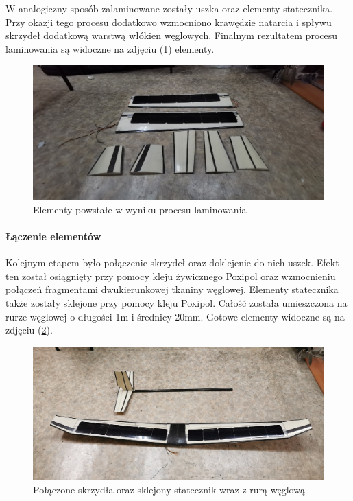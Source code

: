 \documentclass[12pt, a4paper]{article}
\let\oldref\ref
\renewcommand{\ref}[1]{(\oldref{#1})}
\begin{document}
W analogiczny sposób zalaminowane zostały uszka oraz elementy statecznika. Przy okazji tego procesu dodatkowo wzmocniono krawędzie natarcia i spływu skrzydeł dodatkową warstwą włókien węglowych. Finalnym rezultatem procesu laminowania są widoczne na zdjęciu \ref{fig:kompozytki} elementy.

 \begin{figure}[ht]
    \centering
    \includegraphics[width=1\textwidth]{budowa11}
    \caption{Elementy powstałe w wyniku procesu laminowania}
    \label{fig:kompozytki}
\end{figure}

\FloatBarrier
\paragraph{Łączenie elementów}\mbox{}

Kolejnym etapem było połączenie skrzydeł oraz doklejenie do nich uszek. Efekt ten został osiągnięty przy pomocy kleju żywicznego Poxipol oraz wzmocnieniu połączeń fragmentami dwukierunkowej tkaniny węglowej. Elementy statecznika także zostały sklejone przy pomocy kleju Poxipol. Całość została umieszczona na rurze węglowej o długości 1m i średnicy 20mm. Gotowe elementy widoczne są na zdjęciu \ref{fig:sklejone}.

 \begin{figure}[ht]
    \centering
    \includegraphics[width=1\textwidth]{budowa13}
    \caption{Połączone skrzydła oraz sklejony statecznik wraz z rurą węglową}
    \label{fig:sklejone}
\end{figure}
\end{document}
